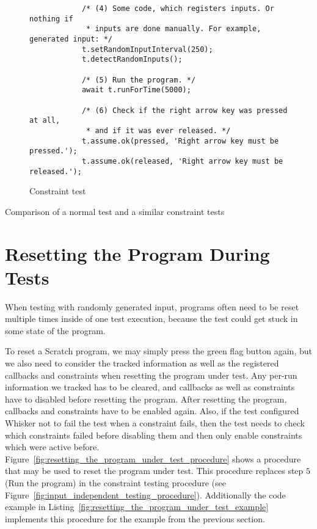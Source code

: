 \begin{listing}[htpb]
\begin{subfigure}[b]{.50\textwidth}
\begin{verbatim}
            /* (4) Some code, which registers inputs. Or nothing if
             * inputs are done manually. For example, generated input: */
            t.setRandomInputInterval(250);
            t.detectRandomInputs();

            /* (5) Run the program. */
            await t.runForTime(5000);

            /* (6) Check if the right arrow key was pressed at all,
             * and if it was ever released. */
            t.assume.ok(pressed, 'Right arrow key must be pressed.');
            t.assume.ok(released, 'Right arrow key must be released.');
        \end{verbatim}
        \vspace{-\bigskipamount}
        \caption{Constraint test}
        \label{fig:normal_input_independent_test_comparison_constraint}
    \end{subfigure}
    \caption{Comparison of a normal test and a similar constraint tests}
    \label{fig:normal_input_independent_test_comparison}
\end{listing}

\section{Resetting the Program During Tests}
\label{sec:resetting_the_program_during_a_test}

When testing with randomly generated input, programs often need to be reset multiple times inside of one test execution,
because the test could get stuck in some state of the program.
\parspace

To reset a Scratch program, we may simply press the green flag button again,
but we also need to consider the tracked information as well as the registered callbacks and constraints when resetting the program under test.
Any per-run information we tracked has to be cleared, and callbacks as well as constraints have to disabled before resetting the program.
After resetting the program, callbacks and constraints have to be enabled again.
Also, if the test configured Whisker not to fail the test when a constraint fails, then the test needs to check which constraints failed before disabling them
and then only enable constraints which were active before.
Figure~\ref{fig:resetting_the_program_under_test_procedure} shows a procedure that may be used to reset the program under test.
This procedure replaces step $5$ (Run the program) in the constraint testing procedure (see Figure~\ref{fig:input_independent_testing_procedure}).
Additionally the code example in Listing~\ref{fig:resetting_the_program_under_test_example}
implements this procedure for the example from the previous section.
\parspace

